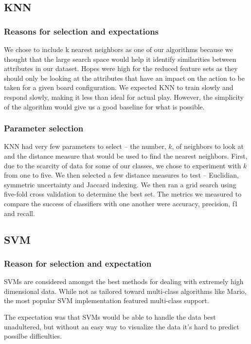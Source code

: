 \documentclass[]{article}   %
\begin{document}
\subsection{KNN}
\subsubsection{Reasons for selection and expectations}
We chose to include k nearest neighbors as one of our algorithms because we thought that the large search space 
would help it identify similarities between attributes in our dataset. Hopes were high for the reduced feature 
sets as they should only be looking at the attributes that have an impact on the action to be taken for a given 
board configuration.  We expected KNN to train slowly and respond slowly, making it less than ideal for actual play. 
However, the simplicity of the algorithm would give us a good baseline for what is possible.

\subsubsection{Parameter selection}
KNN had very few parameters to select – the number, $k$, of neighbors to look at and the distance measure that would 
be used to find the nearest neighbors. First, due to the scarcity of data for some of our classes, we chose to 
experiment with $k$ from one to five. We then selected a few distance measures to test – Euclidian, symmetric uncertainty 
and Jaccard indexing. We then ran a grid search using five-fold cross validation to determine the best set. The metrics 
we measured to compare the success of classifiers with one another were accuracy, precision, f1 and recall. 

\subsection{SVM}
\subsubsection{Reason for selection and expectation}
SVMs are considered amongst the best methods for dealing with extremely high dimensional data.  While not as tailored toward multi-class algorithms like Mario, the most popular SVM implementation featured multi-class support.  

The expectation was that SVMs would be able to handle the data best unadultered, but without an easy way to visualize the data it's hard to predict possilbe difficulties.
\end{document}
